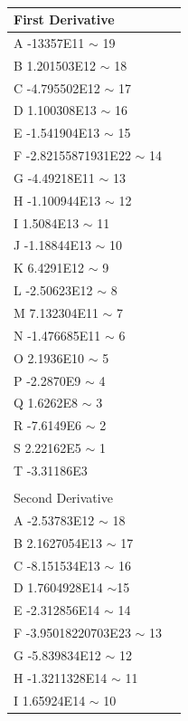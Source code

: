 \documentclass{article}
\begin{document}
\begin{table}
\centering
\caption{}
\label{nathantable2}
\begin{tabular}{@{}ll@{}}
\toprule
First Derivative               &  \\ \midrule
A -13357E11 $\sim$ 19          &  \\
B 1.201503E12 $\sim$ 18        &  \\
C -4.795502E12 $\sim$ 17       &  \\
D 1.100308E13 $\sim$ 16        &  \\
E -1.541904E13 $\sim$ 15       &  \\
F -2.82155871931E22 $\sim$ 14  &  \\
G -4.49218E11 $\sim$ 13        &  \\
H -1.100944E13 $\sim$ 12       &  \\
I 1.5084E13 $\sim$ 11          &  \\
J -1.18844E13 $\sim$ 10        &  \\
K 6.4291E12 $\sim$ 9           &  \\
L -2.50623E12 $\sim$ 8         &  \\
M 7.132304E11 $\sim$ 7         &  \\
N -1.476685E11 $\sim$ 6        &  \\
O 2.1936E10 $\sim$ 5           &  \\
P -2.2870E9 $\sim$ 4           &  \\
Q 1.6262E8 $\sim$ 3            &  \\
R -7.6149E6 $\sim$ 2           &  \\
S 2.22162E5 $\sim$ 1           &  \\
T -3.31186E3                   &  \\
                               &  \\
Second Derivative              &  \\ \midrule
A -2.53783E12 $\sim$ 18        &  \\
B 2.1627054E13 $\sim$ 17       &  \\
C -8.151534E13 $\sim$ 16       &  \\
D 1.7604928E14 $\sim$15        &  \\
E -2.312856E14 $\sim$ 14       &  \\
F -3.95018220703E23 $\sim$ 13  &  \\
G -5.839834E12 $\sim$ 12       &  \\
H -1.3211328E14 $\sim$ 11      &  \\
I 1.65924E14 $\sim$ 10         &  \\

\end{tabular}
\end{table}
\end{document}
